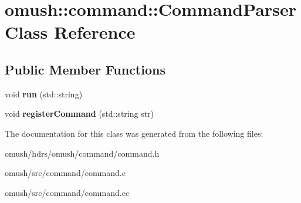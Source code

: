 \hypertarget{classomush_1_1command_1_1_command_parser}{\section{omush\-:\-:command\-:\-:Command\-Parser Class Reference}
\label{classomush_1_1command_1_1_command_parser}
}
\subsection*{Public Member Functions}
\begin{DoxyCompactItemize}
\item 
\hypertarget{classomush_1_1command_1_1_command_parser_a7a583e9a9e2d5b84a9329e644942f941}{void {\bfseries run} (std\-::string)}\label{classomush_1_1command_1_1_command_parser_a7a583e9a9e2d5b84a9329e644942f941}

\item 
\hypertarget{classomush_1_1command_1_1_command_parser_ae92354c2e1efaae99fc34b2212ca187d}{void {\bfseries register\-Command} (std\-::string str)}\label{classomush_1_1command_1_1_command_parser_ae92354c2e1efaae99fc34b2212ca187d}

\end{DoxyCompactItemize}


The documentation for this class was generated from the following files\-:\begin{DoxyCompactItemize}
\item 
omush/hdrs/omush/command/command.\-h\item 
omush/src/command/command.\-c\item 
omush/src/command/command.\-cc\end{DoxyCompactItemize}
